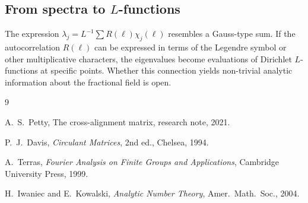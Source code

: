 \documentclass[12pt]{amsart}
\theoremstyle{definition}
\theoremstyle{remark}
\begin{document}
\subsection*{From spectra to $L$-functions}

The expression $\lambda_j = L^{-1} \sum R(\ell) \chi_j(\ell)$
resembles a Gauss-type sum. If the autocorrelation $R(\ell)$ can
be expressed in terms of the Legendre symbol or other
multiplicative characters, the eigenvalues become evaluations of
Dirichlet $L$-functions at specific points. Whether this connection
yields non-trivial analytic information about the fractional field
is open.

\begin{thebibliography}{9}

A.~S.~Petty,
The cross-alignment matrix,
research note, 2021.

P.~J.~Davis,
\emph{Circulant Matrices},
2nd ed., Chelsea, 1994.

A.~Terras,
\emph{Fourier Analysis on Finite Groups and Applications},
Cambridge University Press, 1999.

H.~Iwaniec and E.~Kowalski,
\emph{Analytic Number Theory},
Amer.\ Math.\ Soc., 2004.

\end{thebibliography}
\end{document}

